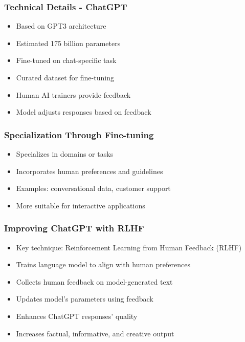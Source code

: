 \begin{frame}[fragile]\frametitle{Technical Details - ChatGPT}
    \begin{itemize}
        \item Based on GPT3 architecture
        \item Estimated 175 billion parameters
        \item Fine-tuned on chat-specific task
        \item Curated dataset for fine-tuning
        \item Human AI trainers provide feedback
        \item Model adjusts responses based on feedback
    \end{itemize}
\end{frame}

\begin{frame}[fragile]\frametitle{Specialization Through Fine-tuning}
    \begin{itemize}
        \item Specializes in domains or tasks
        \item Incorporates human preferences and guidelines
        \item Examples: conversational data, customer support
        \item More suitable for interactive applications
    \end{itemize}
\end{frame}

\begin{frame}[fragile]\frametitle{Improving ChatGPT with RLHF}
    \begin{itemize}
        \item Key technique: Reinforcement Learning from Human Feedback (RLHF)
        \item Trains language model to align with human preferences
        \item Collects human feedback on model-generated text
        \item Updates model's parameters using feedback
        \item Enhances ChatGPT responses' quality
        \item Increases factual, informative, and creative output
    \end{itemize}
\end{frame}

